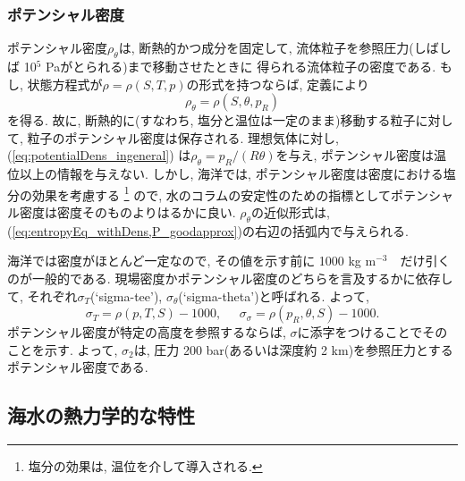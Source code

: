 \subsubsection*{ポテンシャル密度}
ポテンシャル密度$\rho_\theta$は, 断熱的かつ成分を固定して, 流体粒子を参照圧力(しばしば 10$^5$ Paがとられる)まで移動させたときに
得られる流体粒子の密度である. 
もし, 状態方程式が$\rho=\rho(S,T,p)$の形式を持つならば, 定義により
\begin{equation}
 \rho_\theta = \rho(S,\theta, p_R)
 \label{eq:potentialDens_ingeneral}
\end{equation}
を得る. 
故に, 断熱的に(すなわち, 塩分と温位は一定のまま)移動する粒子に対して, 粒子のポテンシャル密度は保存される. 
理想気体に対し, (\ref{eq:potentialDens_ingeneral}) は$\rho_\theta = p_R/(R\theta)$を与え, 
ポテンシャル密度は温位以上の情報を与えない. 
しかし, 海洋では, ポテンシャル密度は密度における塩分の効果を考慮する%
\footnote{
塩分の効果は, 温位を介して導入される. 
}
ので, 
水のコラムの安定性のための指標としてポテンシャル密度は密度そのものよりはるかに良い. 
$\rho_\theta$の近似形式は, (\ref{eq:entropyEq_withDens,P_goodapprox})の右辺の括弧内で与えられる. 
 
海洋では密度がほとんど一定なので, 
その値を示す前に 1000 kg m$^{-3}$　だけ引くのが一般的である. 
現場密度かポテンシャル密度のどちらを言及するかに依存して, 
それぞれ$\sigma_T$(`sigma-tee'), $\sigma_\theta$(`sigma-theta')と呼ばれる. 
よって, 
\begin{equation}
 \sigma_T = \rho(p,T,S) - 1000, \;\;\;\;\;
 \sigma_\sigma = \rho(p_R,\theta,S) - 1000. 
\end{equation}
ポテンシャル密度が特定の高度を参照するならば, $\sigma$に添字をつけることでそのことを示す. 
よって, $\sigma_2$は, 圧力 200 bar(あるいは深度約 2 km)を参照圧力とするポテンシャル密度である. 

\subsection{海水の熱力学的な特性}

